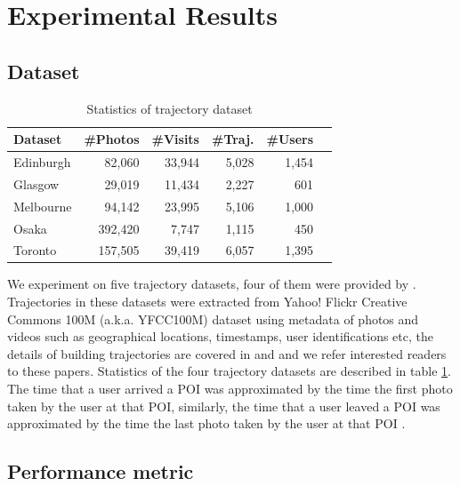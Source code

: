 \section{Experimental Results}
\label{sec:experiment}

\subsection{Dataset}
\label{sec:dataset}

\begin{table}
\caption{Statistics of trajectory dataset}
\label{tab:data}
\centering
\begin{tabular}{l*{5}{r}} \hline
\textbf{Dataset} & \textbf{\#Photos} & \textbf{\#Visits} & \textbf{\#Traj.} & \textbf{\#Users} \\ \hline
Edinburgh & 82,060 & 33,944 & 5,028 & 1,454 \\
Glasgow & 29,019 & 11,434 & 2,227 & 601 \\
Melbourne & 94,142 & 23,995 & 5,106 & 1,000 \\
Osaka & 392,420 & 7,747 & 1,115 & 450 \\
Toronto & 157,505 & 39,419 & 6,057 & 1,395 \\
\hline
\end{tabular}
\end{table}


We experiment on five trajectory datasets, four of them were provided by \cite{ijcai15}.
Trajectories in these datasets were extracted from Yahoo! Flickr Creative Commons 100M
(a.k.a. YFCC100M) dataset\cite{thomee2016yfcc100m} using metadata of photos and videos
such as geographical locations, timestamps, user identifications etc,
the details of building trajectories are covered in \cite{ht10} and \cite{ijcai15} and
we refer interested readers to these papers.
Statistics of the four trajectory datasets are described in table \ref{tab:data}.
%
The time that a user arrived a POI was approximated by the time the first photo taken by the user at that POI,
similarly, the time that a user leaved a POI was approximated by the time the last photo taken by the user at
that POI \cite{ht10, ijcai15}.


\subsection{Performance metric}
\label{sec:metric}


